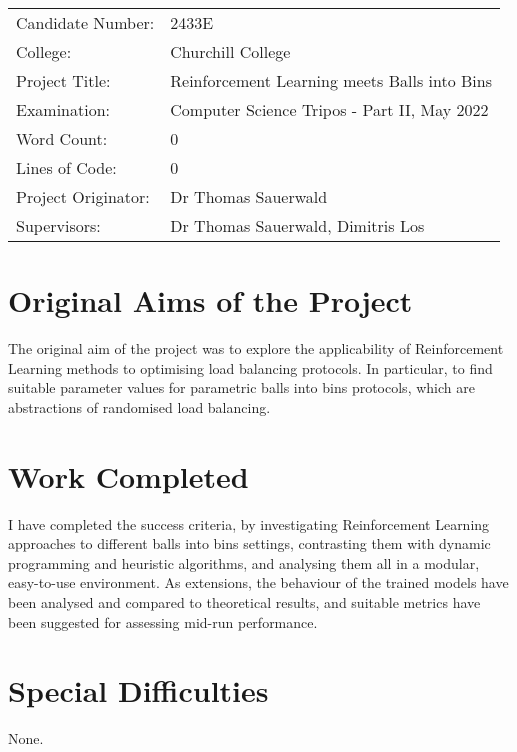 
\begin{proforma}      


\begin{table}[h]
\begin{tabular}{ll}
Candidate Number:  & 2433E \\
College: & Churchill College \\
Project Title:    &  Reinforcement Learning meets Balls into Bins  \\
Examination:  & Computer Science Tripos - Part II, May 2022   \\
Word Count:  & 0  \\
Lines of Code: & 0 \\
Project Originator: & Dr Thomas Sauerwald \\
Supervisors: & Dr Thomas Sauerwald, Dimitris Los 
\end{tabular}
\end{table}

\section*{Original Aims of the Project}

The original aim of the project was to explore the applicability of Reinforcement Learning methods to optimising load balancing protocols. In particular, to find suitable parameter values for parametric balls into bins protocols, which are abstractions of randomised load balancing.

\section*{Work Completed}

I have completed the success criteria, by investigating Reinforcement Learning approaches to different balls into bins settings, contrasting them with dynamic programming and heuristic algorithms, and analysing them all in a modular, easy-to-use environment. As extensions, the behaviour of the trained models have been analysed and compared to theoretical results, and suitable metrics have been suggested for assessing mid-run performance.

\section*{Special Difficulties}

None.

\end{proforma}
